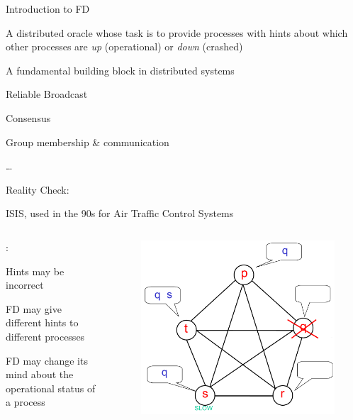 \begin{frame}{Introduction to FD}

\begin{definition}
A \alert{distributed oracle} whose task is to provide processes with \alert{hints} about which other processes
are \emph{up} (operational) or \emph{down} (crashed)
\end{definition}

\begin{overprint}

\BIL
\item A fundamental building block in distributed systems
  \BI
  \item \alert{Reliable Broadcast}
  \item \alert{Consensus}
  \item Group membership \& communication
  \item \ldots
  \EI
\item Reality Check:
  \BI
  \item ISIS, used in the 90s for Air Traffic Control Systems
  \EI
\EIL

\begin{columns}[t]
\begin{column}{0.65\textwidth}

:

\BIL
\item Hints may be incorrect
\item FD may give different hints to different processes
\item FD may change its mind about the operational status of a process	
\EIL	
\end{column}

\begin{column}{0.35\textwidth}

\begin{figure}
\includegraphics[width=\textwidth]{figs/07/fd}
\end{figure}


\end{column}
\end{columns}
\end{overprint}
\end{frame}
